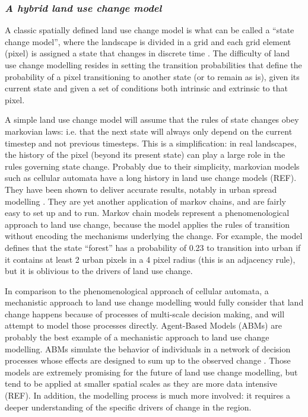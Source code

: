 \subsubsection*{\textit{A hybrid land use change model}}
A classic spatially defined land use change model is what can be called a “state change model”, where the landscape is divided in a grid and each grid element (pixel) is assigned a state that changes in discrete time \citep{daniel_state-and-transition_2016}. The difficulty of land use change modelling resides in setting the transition probabilities that define the probability of a pixel transitioning to another state (or to remain as is), given its current state and given a set of conditions both intrinsic and extrinsic to that pixel.

A simple land use change model will assume that the rules of state changes obey markovian laws: i.e. that the next state will always only depend on the current timestep and not previous timesteps. This is a simplification: in real landscapes, the history of the pixel (beyond its present state) can play a large role in the rules governing state change. Probably due to their simplicity, markovian models such as cellular automata have a long history in land use change models (REF). They have been shown to deliver accurate results, notably in urban spread modelling \citep{soares-filho_dinamicastochastic_2002, jokar_arsanjani_integration_2013, iacono_markov_2015}. They are yet another application of markov chains, and are fairly easy to set up and to run. Markov chain models represent a phenomenological approach to land use change, because the model applies the rules of transition without encoding the mechanisms underlying the  change. For example, the model defines that the state “forest” has a probability of 0.23 to transition into urban if it contains at least 2 urban pixels in a 4 pixel radius (this is an adjacency rule), but it is oblivious to the drivers of land use change.

In comparison to the phenomenological approach of cellular automata, a mechanistic approach to land use change modelling would fully consider that land change happens because of processes of multi-scale decision making, and will attempt to model those processes directly. Agent-Based Models (ABMs) are probably the best example of a mechanistic approach to land use change modelling. ABMs simulate the behavior of individuals in a network of decision processes whose effects are designed to sum up to the observed change \citep{parker_agent-based_2002, filatova_spatial_2013}. Those models are extremely promising for the future of land use change modelling, but tend to be applied at smaller spatial scales as they are more data intensive (REF). In addition, the modelling process is much more involved: it requires a deeper understanding of the specific drivers of change in the region.

